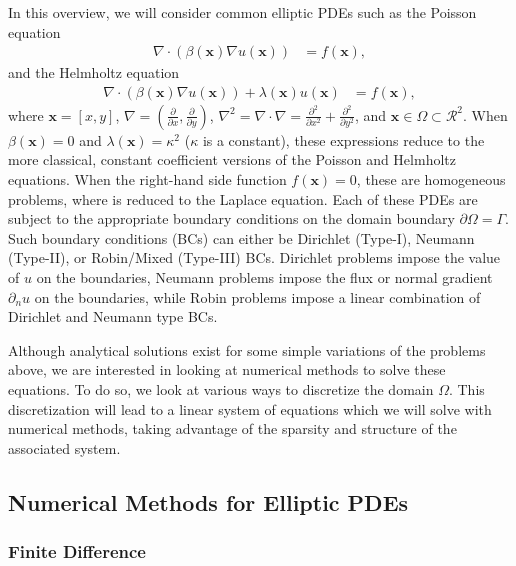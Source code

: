 In this overview, we will consider common elliptic PDEs such as the Poisson equation
\begin{align}
    \nabla \cdot \left( \beta(\textbf{x}) \nabla u(\textbf{x}) \right) &= f(\textbf{x}),
    \label{eq:variable_poisson}
\end{align}
and the Helmholtz equation
\begin{align}
    \nabla \cdot \left( \beta(\textbf{x}) \nabla u(\textbf{x}) \right) + \lambda(\textbf{x}) u(\textbf{x}) &= f(\textbf{x}),
    \label{eq:variable_helmholtz}
\end{align}
where $\textbf{x} = [x, y]$, $\nabla = (\frac{\partial}{\partial x}, \frac{\partial}{\partial y})$, $\nabla^2 = \nabla \cdot \nabla = \frac{\partial^2}{\partial x^2} + \frac{\partial^2}{\partial y^2}$, and $\textbf{x} \in \Omega \subset \mathcal{R}^2$. When $\beta(\textbf{x}) = 0$ and $\lambda(\textbf{x}) = \kappa^2$ ($\kappa$ is a constant), these expressions reduce to the more classical, constant coefficient versions of the Poisson and Helmholtz equations. When the right-hand side function $f(\textbf{x}) = 0$, these are homogeneous problems, where  is reduced to the Laplace equation. Each of these PDEs are subject to the appropriate boundary conditions on the domain boundary $\partial \Omega = \Gamma$. Such boundary conditions (BCs) can either be Dirichlet (Type-I), Neumann (Type-II), or Robin/Mixed (Type-III) BCs. Dirichlet problems impose the value of $u$ on the boundaries, Neumann problems impose the flux or normal gradient $\partial_n u$ on the boundaries, while Robin problems impose a linear combination of Dirichlet and Neumann type BCs.

Although analytical solutions exist for some simple variations of the problems above, we are interested in looking at numerical methods to solve these equations. To do so, we look at various ways to discretize the domain $\Omega$. This discretization will lead to a linear system of equations which we will solve with numerical methods, taking advantage of the sparsity and structure of the associated system.

\subsection{Numerical Methods for Elliptic PDEs}
\label{sec:numerical-methods-for-elliptic-pdes}

\subsubsection{Finite Difference}


